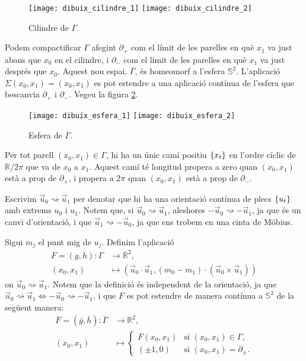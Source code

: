 \begin{figure}[htbp]
    \centering
    \texttt{[image: dibuix\_cilindre\_1]}
    \raisebox{5\height}{$\quad\quad\Large\cong\quad$}
    \texttt{[image: dibuix\_cilindre\_2]}
    \caption{Cilindre de $\Gamma$.}
    \label{fig:cilindre}
\end{figure}

Podem compactificar $\Gamma$ afegint $\partial_+$ com el límit de les parelles en què $x_1$ va just abans que $x_0$ en el cilindre, i $\partial_-$ com el límit de les parelles en què $x_1$ va just després que $x_0$. Aquest nou espai, $\overline{\Gamma}$, és homeomorf a l'esfera $\mathbb S^2$. L'aplicació $\Sigma(x_0,x_1) = (x_0,x_1)$ es pot estendre a una aplicació contínua de l'esfera que bescanvia $\partial_+$ i $\partial_-$. Vegeu la figura \ref{fig:esfera}.

\begin{figure}[htbp]
    \centering
    \texttt{[image: dibuix\_esfera\_1]}
    \raisebox{5\height}{$\quad\quad\Large\cong\quad$}
    \texttt{[image: dibuix\_esfera\_2]}
    \caption{Esfera de $\overline{\Gamma}$.}
    \label{fig:esfera}
\end{figure}

Per tot parell $(x_0,x_1)\in{\Gamma}$, hi ha un únic camí positiu $\{x_t\}$ en l'ordre cíclic de $\mathbb R/2\pi$ que va de $x_0$ a $x_1$. Aquest camí té longitud propera a zero quan $(x_0,x_1)$ està a prop de $\partial_+$, i propera a $2\pi$ quan $(x_0,x_1)$ està a prop de $\partial_-$.

Escrivim $\vec u_0\rightsquigarrow\vec u_1$ per denotar que hi ha una orientació contínua de plecs $\{u_t\}$ amb extrems $u_0$ i $u_1$. Notem que, si $\vec u_0\rightsquigarrow\vec u_1$, aleshores $-\vec u_0\rightsquigarrow-\vec u_1$, ja que és un canvi d'orientació, i que $\vec u_1\rightsquigarrow-\vec u_0$, ja que ens trobem en una cinta de Möbius. 

Sigui $m_j$ el punt mig de $u_j$. Definim l'aplicació
\begin{align*}
    F=(g,h): {\Gamma}&\to\mathbb R^2,\\
    (x_0,x_1)&\mapsto(\vec u_0\cdot\vec u_1, (m_0- m_1)\cdot(\vec u_0\times\vec u_1))
\end{align*}
on $\vec u_0\rightsquigarrow\vec u_1$. Notem que la definició és independent de la orientació, ja que $\vec u_0\rightsquigarrow\vec u_1\iff-\vec u_0\rightsquigarrow-\vec u_1$, i que $F$ es pot estendre de manera contínua a $\mathbb S^2$ de la següent manera:
\begin{align*}
    \overline{F}=(\overline{g},\overline{h}): \overline{\Gamma}&\to\mathbb R^2,\\
    (x_0,x_1)&\mapsto\begin{cases}
        F(x_0,x_1) & \text{si } (x_0,x_1)\in{\Gamma},\\
        (\pm 1,0) & \text{si } (x_0,x_1)={\partial_\pm}.
    \end{cases}
\end{align*}

